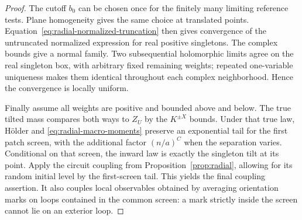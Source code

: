 \begin{proof}
The cutoff $b_0$ can be chosen once for the finitely many limiting
reference tests. Plane homogeneity gives the same choice at
translated points. Equation~\eqref{eq:radial-normalized-truncation}
then gives convergence of the untruncated normalized expression
for real positive singletons. The complex bounds give a normal
family. Two subsequential holomorphic limits agree on the real
singleton box, with arbitrary fixed remaining weights; repeated
one-variable uniqueness makes them identical throughout each
complex neighborhood. Hence the convergence is locally uniform.

Finally assume all weights are positive and bounded above and
below. The true tilted mass compares both ways to $Z_U$ by the
$K^{\pm X}$ bounds. Under that true law, H\"older and
\eqref{eq:radial-macro-moments} preserve an exponential tail for
the first patch screen, with the additional factor $(n/a)^C$
when the separation varies. Conditional on that screen, the inward
law is exactly the singleton tilt at its point. Apply the circuit
coupling from Proposition~\ref{prop:radial}, allowing for its random
initial level by the first-screen tail. This yields the final
coupling assertion. It also couples local observables obtained by
averaging orientation marks on loops contained in the common screen:
a mark strictly inside the screen cannot lie on an exterior loop.
\end{proof}

